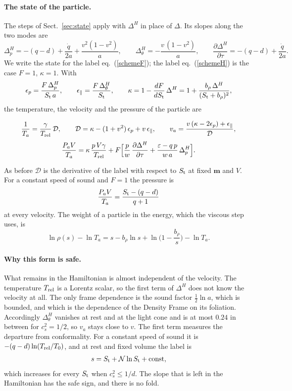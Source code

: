 \documentclass[11pt,aps,preprint,nofootinbib,superscriptaddress,tightenlines]{revtex4-2}
\def\st{\begin{equation}}
\def\stp{\end{equation}}
\def\Eq#1{eq.~(\ref{#1})}
\def\Sect#1{Sect.~\ref{#1}}
\let\oldparagraph\paragraph
\renewcommand{\paragraph}{\par\bigskip\oldparagraph}
\begin{document}
\paragraph{The state of the particle.}  The steps of \Sect{sec:state} apply with $\Delta^H$ in place of $\Delta$.  Its slopes along the two modes are
\st
\Delta_p^{H}=-(q-d)+\frac{\dot q}{2a}+\frac{v^2(1-v^2)}{a},\qquad
\Delta_\theta^{H}=-\frac{v\,(1-v^2)}{a},\qquad
\frac{\partial\Delta^H}{\partial\tau}=-(q-d)+\frac{\dot q}{2a} .
\label{slopesH}
\stp
We write the state for the label \Eq{schemeF}; the label \Eq{schemeH} is the case $F=1$, $\kappa=1$.  With
\st
\epsilon_p=\frac{F\,\Delta_p^{H}}{S_{\rm t}\,a},\qquad \epsilon_\parallel=\frac{F\,\Delta_\theta^{H}}{S_{\rm t}},\qquad
\kappa=1-\frac{dF}{dS_{\rm t}}\,\Delta^H=1+\frac{b_\rho\,\Delta^H}{(S_{\rm t}+b_\rho)^2},
\stp
the temperature, the velocity and the pressure of the particle are
\begin{keyeq}
\st
\frac1{T_a}=\frac\gamma{T_{\rm rel}}\,\mathcal D,\qquad
\mathcal D=\kappa-(1+v^2)\,\epsilon_p+v\,\epsilon_\parallel,\qquad
v_a=\frac{v\,(\kappa-2\epsilon_p)+\epsilon_\parallel}{\mathcal D} ,
\label{TavaH}
\stp
\st
\frac{P_aV}{T_a}=\kappa\,\frac{p\,V\gamma}{T_{\rm rel}}+F\Big[\frac pw\,\frac{\partial\Delta^H}{\partial\tau}+\frac{\varepsilon-q\,p}{w\,a}\,\Delta_p^{H}\Big] .
\label{PaH}
\stp
\end{keyeq}
As before $\mathcal D$ is the derivative of the label with respect to $S_{\rm t}$ at fixed $\bm m$ and $V$.  For a constant speed of sound and $F=1$
the pressure is
\st
\frac{P_aV}{T_a}=\frac{S_{\rm t}-(q-d)}{q+1}
\stp
at every velocity.  The weight of a particle in the energy, which the viscous step uses, is
\st
\ln\rho(s)-\ln T_a=s-b_\rho\ln s+\ln\Big(1-\frac{b_\rho} s\Big)-\ln T_a .
\label{weightH}
\stp

\paragraph{Why this form is safe.}  What remains in the Hamiltonian is almost independent of the velocity.  The temperature $T_{\rm rel}$ is a
Lorentz scalar, so the first term of $\Delta^H$ does not know the velocity at all.  The only frame dependence is the sound factor
$\tfrac12\ln a$, which is bounded, and which is the dependence of the Density Frame on its foliation.  Accordingly $\Delta_\theta^H$ vanishes at rest
and at the light cone and is at most $0.24$ in between for $c_s^2=1/2$, so $v_a$ stays close to $v$.  The first term measures the departure from conformality.
For a constant speed of sound it is $-(q-d)\ln(T_{\rm rel}/T_0)$, and at rest and fixed volume the label is
\st
s=S_{\rm t}+\mathcal N\ln S_{\rm t}+\text{const} ,
\stp
which increases for every $S_{\rm t}$ when $c_s^2\le1/d$.  The slope that is left in the Hamiltonian has the safe sign, and there is no fold.
\end{document}

